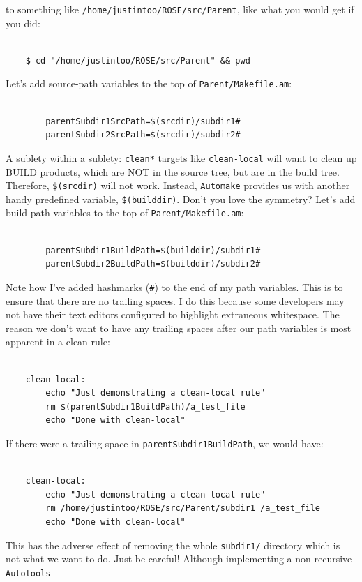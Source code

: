 to something like \texttt{/home/justintoo/ROSE/src/Parent}, like what you would get if you did:
    \begin{verbatim}

    $ cd "/home/justintoo/ROSE/src/Parent" && pwd 
    \end{verbatim}
Let's add source-path variables to the top of \texttt{Parent/Makefile.am}: 
    \begin{verbatim}

        parentSubdir1SrcPath=$(srcdir)/subdir1#
        parentSubdir2SrcPath=$(srcdir)/subdir2#
    \end{verbatim}
A sublety within a sublety: \texttt{clean*} targets like \texttt{clean-local} will want to
clean up BUILD products, which are NOT in the source tree, but are in the build tree. Therefore,
\texttt{\$(srcdir)} will not work. Instead, \texttt{Automake} provides us with another handy
predefined variable, \texttt{\$(builddir)}. Don't you love the symmetry?
Let's add build-path variables to the top of \texttt{Parent/Makefile.am}: 
    \begin{verbatim}

        parentSubdir1BuildPath=$(builddir)/subdir1#
        parentSubdir2BuildPath=$(builddir)/subdir2#
    \end{verbatim}
Note how I've added hashmarks (\texttt{\#}) to the end of my path variables. This is to ensure
that there are no trailing spaces. I do this because some developers may not have their
text editors configured to highlight extraneous whitespace. The reason we don't want to
have any trailing spaces after our path variables is most apparent in a clean rule:
    \begin{verbatim}

    clean-local:
        echo "Just demonstrating a clean-local rule"
        rm $(parentSubdir1BuildPath)/a_test_file
        echo "Done with clean-local"
    \end{verbatim}
If there were a trailing space in \texttt{parentSubdir1BuildPath}, we would have:
    \begin{verbatim}

    clean-local:
        echo "Just demonstrating a clean-local rule"
        rm /home/justintoo/ROSE/src/Parent/subdir1 /a_test_file
        echo "Done with clean-local"
    \end{verbatim}
This has the adverse effect of removing the whole \texttt{subdir1/} directory which is not
what we want to do. Just be careful! Although implementing a non-recursive \texttt{Autotools}
